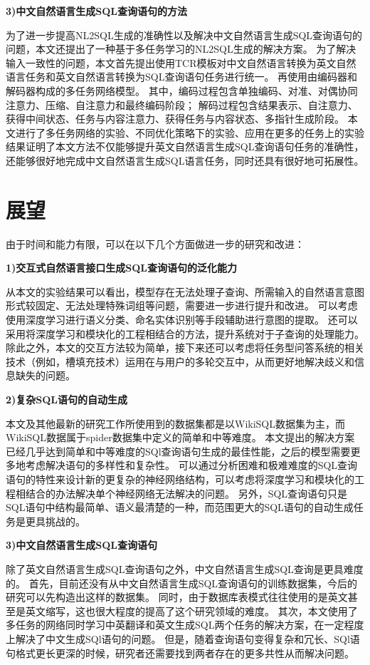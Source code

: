 \textbf{3)中文自然语言生成SQL查询语句的方法}

为了进一步提高NL2SQL生成的准确性以及解决中文自然语言生成SQL查询语句的问题，本文还提出了一种基于多任务学习的NL2SQL生成的解决方案。
为了解决输入一致性的问题，本文首先提出使用TCR模板对中文自然语言转换为英文自然语言任务和英文自然语言转换为SQL查询语句任务进行统一。
再使用由编码器和解码器构成的多任务网络模型。
其中，编码过程包含单独编码、对准、对偶协同注意力、压缩、自注意力和最终编码阶段；
解码过程包含结果表示、自注意力、获得中间状态、任务与内容注意力、获得任务与内容状态、多指针生成阶段。
本文进行了多任务网络的实验、不同优化策略下的实验、应用在更多的任务上的实验结果证明了本文方法不仅能够提升英文自然语言生成SQL查询语句任务的准确性，还能够很好地完成中文自然语言生成SQL语言任务，同时还具有很好地可拓展性。

\section{展望}

由于时间和能力有限，可以在以下几个方面做进一步的研究和改进：

\textbf{1)交互式自然语言接口生成SQL查询语句的泛化能力}

从本文的实验结果可以看出，模型存在无法处理子查询、所需输入的自然语言意图形式较固定、无法处理特殊词组等问题，需要进一步进行提升和改进。
可以考虑使用深度学习进行语义分类、命名实体识别等手段辅助进行意图的提取。
还可以采用将深度学习和模块化的工程相结合的方法，提升系统对于子查询的处理能力。
除此之外，本文的交互方法较为简单，接下来还可以考虑将任务型问答系统的相关技术（例如，槽填充技术）运用在与用户的多轮交互中，从而更好地解决歧义和信息缺失的问题。


\textbf{2)复杂SQL语句的自动生成}

本文及其他最新的研究工作所使用到的数据集都是以WikiSQL数据集为主，而WikiSQL数据属于spider数据集中定义的简单和中等难度。
本文提出的解决方案已经几乎达到简单和中等难度的SQl查询语句生成的最佳性能，之后的模型需要更多地考虑解决语句的多样性和复杂性。
可以通过分析困难和极难难度的SQL查询语句的特性来设计新的更复杂的神经网络结构，可以考虑将深度学习和模块化的工程相结合的办法解决单个神经网络无法解决的问题。
另外，SQL查询语句只是SQL语句中结构最简单、语义最清楚的一种，而范围更大的SQL语句的自动生成任务是更具挑战的。

\textbf{3)中文自然语言生成SQL查询语句}

除了英文自然语言生成SQL查询语句之外，中文自然语言生成SQL查询是更具难度的。
首先，目前还没有从中文自然语言生成SQL查询语句的训练数据集，今后的研究可以先构造出这样的数据集。
同时，由于数据库表模式往往使用的是英文甚至是英文缩写，这也很大程度的提高了这个研究领域的难度。
其次，本文使用了多任务的网络同时学习中英翻译和英文生成SQL两个任务的解决方案，在一定程度上解决了中文生成SQl语句的问题。
但是，随着查询语句变得复杂和冗长、SQl语句格式更长更深的时候，研究者还需要找到两者存在的更多共性从而解决问题。



